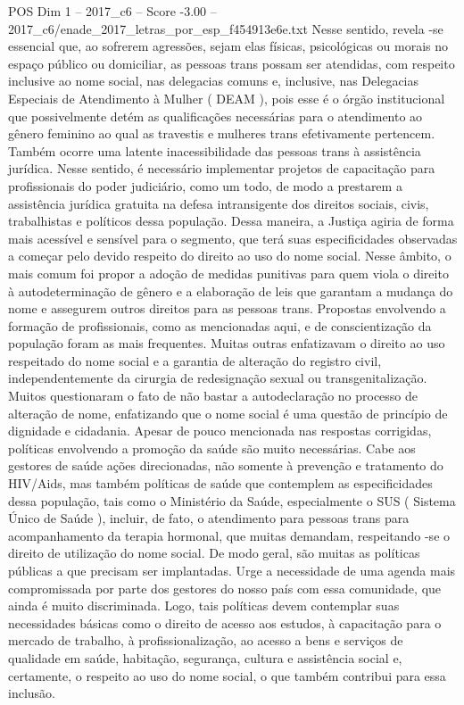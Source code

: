 \begin{textsample}{POS Dim 1 – 2017\_c6 – Score -3.00 – 2017\_c6/enade\_2017\_letras\_por\_esp\_f454913e6e.txt}
Nesse sentido, revela -se essencial que, ao sofrerem agressões, sejam elas físicas, psicológicas ou morais no espaço público ou domiciliar, as pessoas trans possam ser atendidas, com respeito inclusive ao nome social, nas delegacias comuns e, inclusive, nas Delegacias Especiais de Atendimento à Mulher ( DEAM ), pois esse é o órgão institucional que possivelmente detém as qualificações necessárias para o atendimento ao gênero feminino ao qual as travestis e mulheres trans efetivamente pertencem.
Também ocorre uma latente inacessibilidade das pessoas trans à assistência jurídica.
Nesse sentido, é necessário implementar projetos de capacitação para profissionais do poder judiciário, como um todo, de modo a prestarem a assistência jurídica gratuita na defesa intransigente dos direitos sociais, civis, trabalhistas e políticos dessa população.
Dessa maneira, a Justiça agiria de forma mais acessível e sensível para o segmento, que terá suas especificidades observadas a começar pelo devido respeito do direito ao uso do nome social.
Nesse âmbito, o mais comum foi propor a adoção de medidas punitivas para quem viola o direito à autodeterminação de gênero e a elaboração de leis que garantam a mudança do nome e assegurem outros direitos para as pessoas trans.
Propostas envolvendo a formação de profissionais, como as mencionadas aqui, e de conscientização da população foram as mais frequentes.
Muitas outras enfatizavam o direito ao uso respeitado do nome social e a garantia de alteração do registro civil, independentemente da cirurgia de redesignação sexual ou transgenitalização.
Muitos questionaram o fato de não bastar a autodeclaração no processo de alteração de nome, enfatizando que o nome social é uma questão de princípio de dignidade e cidadania.
Apesar de pouco mencionada nas respostas corrigidas, políticas envolvendo a promoção da saúde são muito necessárias.
Cabe aos gestores de saúde ações direcionadas, não somente à prevenção e tratamento do HIV/Aids, mas também políticas de saúde que contemplem as especificidades dessa população, tais como o Ministério da Saúde, especialmente o SUS ( Sistema Único de Saúde ), incluir, de fato, o atendimento para pessoas trans para acompanhamento da terapia hormonal, que muitas demandam, respeitando -se o direito de utilização do nome social.
De modo geral, são muitas as políticas públicas a que precisam ser implantadas.
Urge a necessidade de uma agenda mais compromissada por parte dos gestores do nosso país com essa comunidade, que ainda é muito discriminada.
Logo, tais políticas devem contemplar suas necessidades básicas como o direito de acesso aos estudos, à capacitação para o mercado de trabalho, à profissionalização, ao acesso a bens e serviços de qualidade em saúde, habitação, segurança, cultura e assistência social e, certamente, o respeito ao uso do nome social, o que também contribui para essa inclusão.

\end{textsample}
